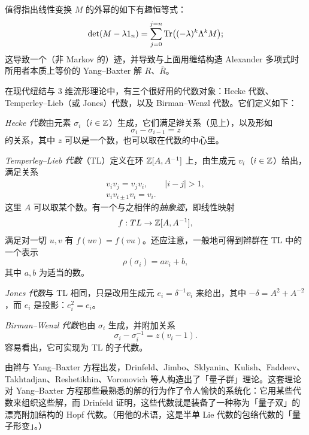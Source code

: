 值得指出线性变换 $M$ 的外幂的如下有趣恒等式：
\[
\det(M-\lambda 1_n)=\sum_{j=0}^{j=n}\operatorname{Tr}\bigl((-\lambda)^k\Lambda^k M\bigr);
\]
这导致一个（非 Markov 的）迹，并导致与上面用缠结构造 Alexander 多项式时所用者本质上等价的 Yang--Baxter 解 $R$、$\bar R$。

在现代纽结与 3 维流形理论中，有三个很好用的代数对象：Hecke 代数、Temperley--Lieb（或 Jones）代数，以及 Birman--Wenzl 代数。它们定义如下：


\emph{Hecke 代数}由元素 $\sigma_i$（$i\in\mathbb{Z}$）生成，它们满足辫关系（见上），以及形如
\[
\sigma_i-\sigma_{i-1}=z
\]
的关系，其中 $z$ 可以是一个数，也可以取在代数的中心里。


\emph{Temperley--Lieb 代数}（TL）定义在环 $\mathbb{Z}[A,A^{-1}]$ 上，由生成元 $v_i$（$i\in\mathbb{Z}$）给出，满足关系
\begin{gather*}
v_iv_j=v_jv_i,\qquad |i-j|>1,\\
v_iv_{i\pm1}v_i=v_i.
\end{gather*}
这里 $A$ 可以取某个数。有一个与之相伴的\emph{抽象迹}，即线性映射
\[
f:TL\to\mathbb{Z}[A,A^{-1}],
\]
满足对一切 $u,v$ 有 $f(uv)=f(vu)$。还应注意，一般地可得到辫群在 TL 中的一个表示
\[
\rho(\sigma_i)=av_i+b,
\]
其中 $a,b$ 为适当的数。

\emph{Jones 代数}与 TL 相同，只是改用生成元 $e_i=\delta^{-1}v_i$ 来给出，其中 $-\delta=A^2+A^{-2}$，而 $e_i$ 是投影：$e_i^2=e_i$。

\emph{Birman--Wenzl 代数}也由 $\sigma_i$ 生成，并附加关系
\[
\sigma_i-\sigma_i^{-1}=z(v_i-1).
\]
容易看出，它可实现为 TL 的子代数。

由辫与 Yang--Baxter 方程出发，Drinfeld、Jimbo、Sklyanin、Kulish、Faddeev、Takhtadjan、Reshetikhin、Voronovich 等人构造出了「量子群」理论。这套理论对 Yang--Baxter 方程那些最熟悉的解的行为作了令人愉快的系统化：它用某些代数来组织这些解，而 Drinfeld 证明，这些代数就是装备了一种称为「量子双」的漂亮附加结构的 Hopf 代数。（用他的术语，这是半单 Lie 代数的包络代数的「量子形变」。）

